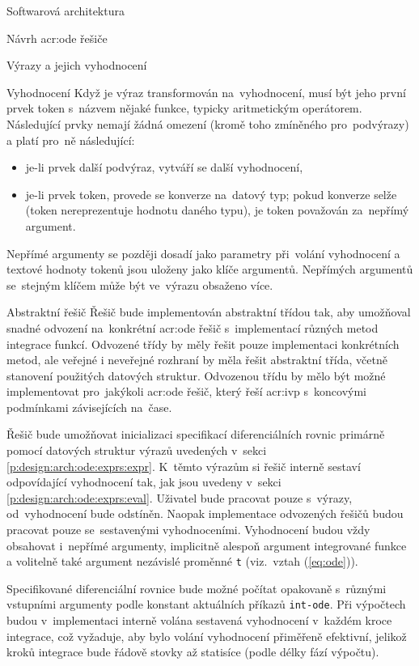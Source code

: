 \documentclass[thesis=M,czech]{FITthesis}[2012/06/26]
\newcommand{\acrlabel}[1]{acr:#1}
\newcommand{\acr}[1]{\acrshort{\acrlabel{#1}}}
\newcommand{\id}[1]{\texttt{#1}}
\newcommand{\rf}[1]{\ref{#1}}
\newcommand{\rfeq}[1]{(\rf{eq:#1})}
\begin{document}
\begin{section}{Softwarová architektura}
\begin{subsection}{Návrh \acr{ode} řešiče}
\begin{subsubsection}{Výrazy a jejich vyhodnocení}
\begin{paragraph}{Vyhodnocení}
Když je výraz transformován na~vyhodnocení,
musí být jeho první prvek token s~názvem nějaké funkce,
typicky aritmetickým operátorem.
Následující prvky nemají žádná omezení
(kromě toho zmíněného pro~podvýrazy)
a platí pro~ně následující:
\begin{itemize}
\item je-li prvek další podvýraz, vytváří se další vyhodnocení,
\item je-li prvek token, provede se konverze na~datový typ;
   pokud konverze selže (token nereprezentuje hodnotu daného typu),
   je token považován za~nepřímý argument.
\end{itemize}
Nepřímé argumenty se později dosadí
jako parametry při~volání vyhodnocení
a textové hodnoty tokenů jsou uloženy jako klíče argumentů.
Nepřímých argumentů se~stejným klíčem
může být ve~výrazu obsaženo více.
\end{paragraph} %


\end{subsubsection} %


\begin{subsubsection}{Abstraktní řešič}\label{sss:design:arch:ode:solver}
Řešič bude implementován abstraktní třídou tak,
aby umožňoval snadné odvození na~konkrétní \acr{ode} řešič
s~implementací různých metod integrace funkcí.
Odvozené třídy by měly řešit pouze implementaci konkrétních metod,
ale veřejné i neveřejné rozhraní by měla řešit abstraktní třída,
včetně stanovení použitých datových struktur.
Odvozenou třídu by mělo být možné
implementovat pro~jakýkoli \acr{ode} řešič,
který řeší \acr{ivp} s~koncovými podmínkami závisejících na~čase.

Řešič bude umožňovat inicializaci
specifikací diferenciálních rovnic
primárně pomocí datových struktur výrazů uvedených
v~sekci \rf{p:design:arch:ode:exprs:expr}.
K~těmto výrazům si řešič interně sestaví odpovídající
vyhodnocení tak, jak jsou uvedeny
v~sekci \rf{p:design:arch:ode:exprs:eval}.
Uživatel bude pracovat pouze s~výrazy,
od~vyhodnocení bude odstíněn.
Naopak implementace odvozených řešičů
budou pracovat pouze se~sestavenými vyhodnoceními.
Vyhodnocení budou vždy obsahovat i~nepřímé argumenty,
implicitně alespoň argument integrované funkce
a volitelně také argument nezávislé proměnné \id{t}
(viz.~vztah \rfeq{ode}).

Specifikované diferenciální rovnice bude možné počítat opakovaně
s~různými vstupními argumenty podle konstant
aktuálních příkazů \id{int\--ode}.
Při výpočtech budou v~implementaci
interně volána sestavená vyhodnocení
v~každém kroce integrace,
což vyžaduje, aby bylo volání vyhodnocení
přiměřeně efektivní,
jelikož kroků integrace
bude řádově stovky až statisíce
(podle délky fází výpočtu).


\end{subsubsection}
\end{subsection}
\end{section}
\end{document}
